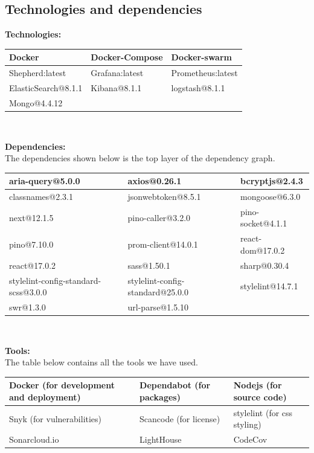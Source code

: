\documentclass{article}
\begin{document}
\subsection{Technologies and dependencies}
    
\textbf{Technologies:}
\begin{center}
\begin{tabularx}{0.8\textwidth} { 
  | >{\centering\arraybackslash}X 
  | >{\centering\arraybackslash}X 
  | >{\centering\arraybackslash}X |  }
 \hline
 Docker & Docker-Compose & Docker-swarm \\
 \hline
 Shepherd:latest  & Grafana:latest  & Prometheus:latest  \\
\hline
 ElasticSearch@8.1.1  & Kibana@8.1.1  & logstash@8.1.1  \\
\hline
 Mongo@4.4.12  &   &   \\
\hline
\end{tabularx}\\
\end{center}
\newpage
\textbf{Dependencies:}\\
The dependencies shown below is the top layer of the dependency graph.
\begin{center}
\begin{tabularx}{0.8\textwidth} { 
  | >{\centering\arraybackslash}X 
  | >{\centering\arraybackslash}X 
  | >{\centering\arraybackslash}X | }
 \hline
 aria-query@5.0.0 & axios@0.26.1 & bcryptjs@2.4.3 \\
 \hline
 classnames@2.3.1  & jsonwebtoken@8.5.1  & mongoose@6.3.0  \\
\hline
 next@12.1.5  & pino-caller@3.2.0  & pino-socket@4.1.1  \\
\hline
 pino@7.10.0  & prom-client@14.0.1  & react-dom@17.0.2  \\
\hline
 react@17.0.2  & sass@1.50.1  & sharp@0.30.4  \\
\hline
 stylelint-config-standard-scss@3.0.0  & 
 stylelint-config-standard@25.0.0  & stylelint@14.7.1  \\
\hline
 swr@1.3.0  & url-parse@1.5.10  &   \\
\hline
\end{tabularx}\\
\end{center}


\textbf {Tools:}\\
The table below contains all the tools we have used.
\begin{center}
\begin{tabularx}{0.8\textwidth} { 
  | >{\centering\arraybackslash}X 
  | >{\centering\arraybackslash}X 
  | >{\centering\arraybackslash}X | }
 \hline
 Docker (for development and deployment) & Dependabot (for packages) & 
  Nodejs (for source code) \\  
  \hline
 Snyk (for vulnerabilities)  &  Scancode (for license)  &  stylelint (for css styling)\\
\hline
 Sonarcloud.io  & LightHouse & CodeCov\\
\hline
\end{tabularx}
\end{center}
\end{document}
